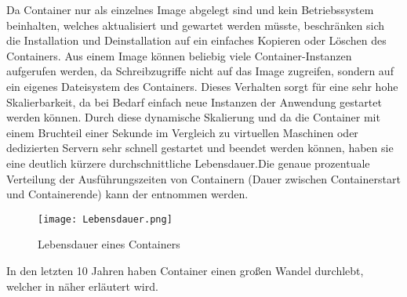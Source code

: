 Da Container nur als einzelnes Image abgelegt sind und kein Betriebssystem beinhalten, welches aktualisiert und gewartet werden müsste, beschränken sich die Installation und Deinstallation auf ein einfaches Kopieren oder Löschen des Containers. 
Aus einem Image können beliebig viele Container-Instanzen aufgerufen werden, da Schreibzugriffe nicht auf das Image zugreifen, sondern auf ein eigenes Dateisystem des Containers. Dieses Verhalten sorgt für eine sehr hohe Skalierbarkeit, da bei Bedarf einfach neue Instanzen der Anwendung gestartet werden können. \cite{12771285120180201}
Durch diese dynamische Skalierung und da die Container mit einem Bruchteil einer Sekunde im Vergleich zu virtuellen Maschinen oder dedizierten Servern sehr schnell gestartet und beendet werden können, haben sie eine deutlich kürzere durchschnittliche Lebensdauer.\newpage Die genaue prozentuale Verteilung der Ausführungszeiten von Containern (Dauer zwischen Containerstart und Containerende) kann der  entnommen werden.
\begin{figure}[H]
	\begin{center}
		\texttt{[image: Lebensdauer.png]}
	\end{center}
	\caption[Lebensdauer eines Containers]{Lebensdauer eines Containers \footnotemark}
	\label{fig:Lebensdauer}
\end{figure}
In den letzten 10 Jahren haben Container einen großen Wandel durchlebt, welcher in  näher erläutert wird.
\newpage